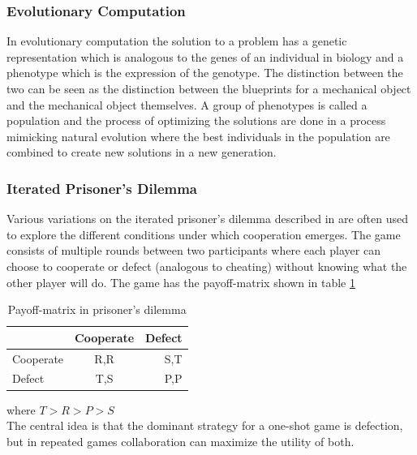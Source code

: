 \documentclass[a4paper]{book}
\begin{document}
\subsubsection{Evolutionary Computation} In evolutionary computation the solution to a problem has a genetic representation which is analogous to the genes of an individual in biology and a phenotype which is the expression of the genotype. The distinction between the two can be seen as the distinction between the blueprints for a mechanical object and the mechanical object themselves. A group of phenotypes is called a population and the process of optimizing the solutions are done in a process mimicking natural evolution where the best individuals in the population are combined to create new solutions in a new generation. 
\subsubsection{Iterated Prisoner's Dilemma}
Various variations on the iterated prisoner's dilemma described in \cite{axelrod_evolution_1981} are often used to explore the different conditions under which cooperation emerges. The game consists of multiple rounds between two participants where each player can choose to cooperate or defect (analogous to cheating) without knowing what the other player will do. The game has the  payoff-matrix shown in table \ref{table:payoff}

\begin{table}[htdp]
\begin{center}
\begin{tabular}{|l|c|r|}
	\hline
			& Cooperate 	& Defect \\ \hline
	Cooperate	& R,R		& S,T	 \\ \hline
	Defect		& T,S	 	& P,P \\\hline\hline
	\end{tabular}
\end{center}
\label{table:payoff}
\caption{Payoff-matrix in prisoner's dilemma}
\end{table}
where $ T > R > P > S$ \\

The central idea is that the dominant strategy for a one-shot game is defection, but in repeated games collaboration can maximize the utility of both.


\end{document}
